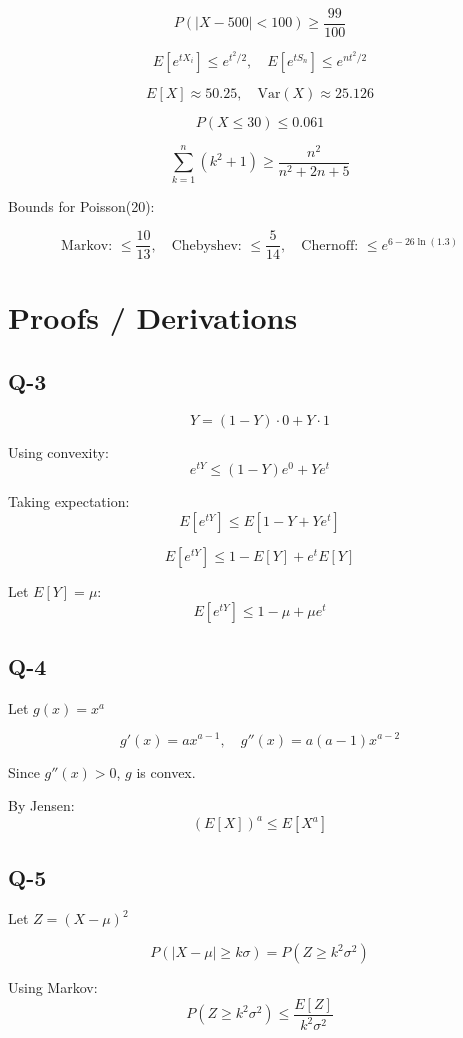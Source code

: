 \documentclass[12pt]{article}
\begin{document}
\[
P(|X - 500| < 100) \ge \frac{99}{100}
\]

\[
E[e^{tX_i}] \le e^{t^2/2}, \quad E[e^{tS_n}] \le e^{nt^2/2}
\]

\[
E[X] \approx 50.25, \quad \mathrm{Var}(X) \approx 25.126
\]

\[
P(X \le 30) \le 0.061
\]

\[
\sum_{k=1}^{n} (k^2 + 1) \ge \frac{n^2}{n^2 + 2n + 5}
\]

Bounds for Poisson(20):

\[
\text{Markov: } \le \frac{10}{13}, \quad
\text{Chebyshev: } \le \frac{5}{14}, \quad
\text{Chernoff: } \le e^{6 - 26 \ln(1.3)}
\]

\section*{Proofs / Derivations}

\subsection*{Q-3}

\[
Y = (1 - Y)\cdot 0 + Y \cdot 1
\]

Using convexity:
\[
e^{tY} \le (1 - Y)e^0 + Ye^t
\]

Taking expectation:
\[
E[e^{tY}] \le E[1 - Y + Ye^t]
\]

\[
E[e^{tY}] \le 1 - E[Y] + e^t E[Y]
\]

Let $E[Y] = \mu$:
\[
E[e^{tY}] \le 1 - \mu + \mu e^t
\]

\subsection*{Q-4}

Let $g(x) = x^a$

\[
g'(x) = ax^{a-1}, \quad g''(x) = a(a-1)x^{a-2}
\]

Since $g''(x) > 0$, $g$ is convex.

By Jensen:
\[
(E[X])^a \le E[X^a]
\]

\subsection*{Q-5}

Let $Z = (X - \mu)^2$

\[
P(|X - \mu| \ge k\sigma) = P(Z \ge k^2\sigma^2)
\]

Using Markov:
\[
P(Z \ge k^2\sigma^2) \le \frac{E[Z]}{k^2\sigma^2}
\]
\end{document}
